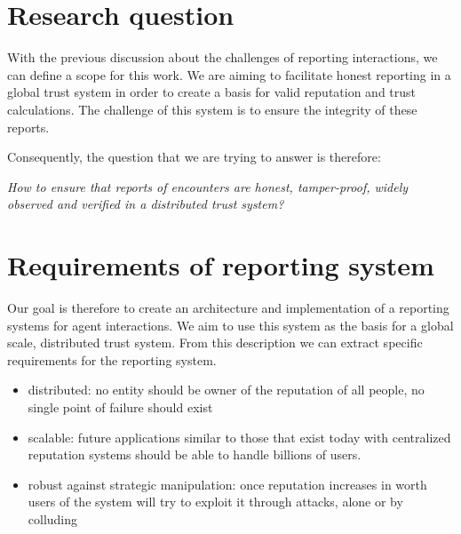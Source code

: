 
\section{Research question}
With the previous discussion about the challenges of reporting interactions, we can define a scope
for this work. We are aiming to facilitate honest reporting in a global trust system in order to 
create a basis for valid reputation and trust calculations. The challenge of this system is to 
ensure the integrity of these reports. 

Consequently, the question that we are trying to answer is therefore:
\begin{center}
    \textit{How to ensure that reports of encounters are honest, tamper-proof, widely observed and verified in a distributed trust system?}
\end{center}


\section{Requirements of reporting system}
Our goal is therefore to create an architecture and implementation of a reporting systems for agent 
interactions. We aim to use this system as the basis for a global scale, distributed trust system. 
From this description we can extract specific requirements for the reporting system.


\begin{itemize}
    \item distributed: no entity should be owner of the reputation of all people, no single point of
    failure should exist
    \item scalable: future applications similar to those that exist today with centralized reputation
    systems should be able to handle billions of users.
    \item robust against strategic manipulation: once reputation increases in worth users of the 
    system will try to exploit it through attacks, alone or by colluding
\end{itemize}



